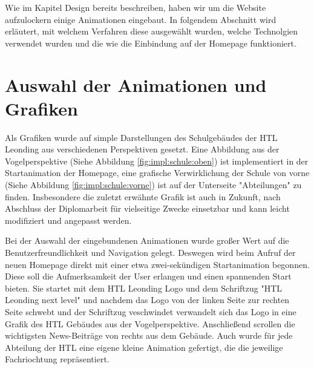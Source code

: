 Wie im Kapitel Design bereits beschreiben, haben wir um die Website aufzulockern einige Animationen eingebaut. 
In folgendem Abschnitt wird erläutert, mit welchem Verfahren diese ausgewählt wurden, welche Technolgien verwendet wurden und die 
wie die Einbindung auf der Homepage funktioniert.

\section{Auswahl der Animationen und Grafiken} \label{sec:animationen:Aimationen}

Als Grafiken wurde auf simple Darstellungen des Schulgebäudes der HTL Leonding aus verschiedenen Perspektiven gesetzt. 
Eine Abbildung aus der Vogelperspektive (Siehe Abbildung \ref{fig:impl:schule:oben}) ist implementiert in der Startanimation der Homepage, 
eine grafische Verwirklichung der Schule von vorne (Siehe Abbildung \ref{fig:impl:schule:vorne})
ist auf der Unterseite "Abteilungen" zu finden. Insbesondere die zuletzt erwähnte Grafik ist auch in Zukunft, nach Abschluss der Diplomarbeit
für vielseitige Zwecke einsetzbar und kann leicht modifiziert und angepasst werden.

Bei der Auswahl der eingebundenen Animationen wurde großer Wert auf die Benutzerfreundlichkeit und Navigation gelegt.
Deswegen wird beim Aufruf der neuen Homepage direkt mit einer etwa zwei-sekündigen Startanimation begonnen. Diese soll die 
Aufmerksamkeit der User erlangen und einen spannenden Start bieten. Sie startet mit dem HTL Leonding Logo und dem Schriftzug "HTL Leonding next level" und nachdem
das Logo von der linken Seite zur rechten Seite schwebt und der Schriftzug veschwindet verwandelt sich das Logo in eine Grafik des 
HTL Gebäudes aus der Vogelperspektive. Anschließend scrollen die wichtigsten News-Beiträge von rechts aus dem Gebäude. 
Auch wurde für jede Abteilung der HTL eine eigene kleine Animation gefertigt, die die jeweilige Fachriochtung repräsentiert.


